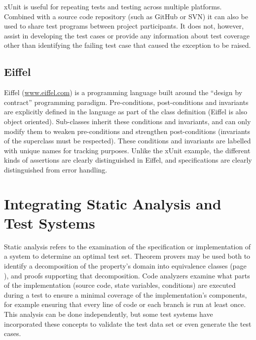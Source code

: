 xUnit is useful for repeating tests and testing across multiple platforms.
Combined with a source code repository (such as GitHub or SVN) it
can also be used to share test programs between project participants.
It does not, however,  assist in developing the test cases or provide any information 
about test coverage other than identifying the failing test case that caused the exception to be raised.

\subsection{Eiffel}

Eiffel (\url{www.eiffel.com}) is a programming language built around 
the ``design by contract'' programming paradigm.
Pre-conditions, post-conditions and invariants 
are explicitly defined in the language as part of the class definition
(Eiffel is also object oriented).
Sub-classes inherit these conditions and invariants,
and can only modify them to weaken pre-conditions
and strengthen post-conditions (invariants of the superclass must be respected).
These conditions and invariants are labelled 
with unique names for tracking purposes.
Unlike the xUnit example,
the different kinds of assertions are clearly distinguished in Eiffel,
and specifications are clearly distinguished from error handling.


\section{Integrating Static Analysis and Test Systems}

Static analysis refers to the examination of 
the specification or implementation of a system
to determine an optimal test set.
Theorem provers may be used both to 
identify a decomposition of the property's domain
into equivalence classes (page \pageref{sub:uniformity}),
and proofs supporting that decomposition.
Code analyzers examine what parts of the implementation
(source code, state variables, conditions) are executed during a test
to ensure a minimal coverage of the implementation's components,
for example ensuring that every line of code or each branch is run at least once.
This analysis can be done independently,
but some test systems have incorporated these concepts
to validate the test data set or even generate the test cases.

